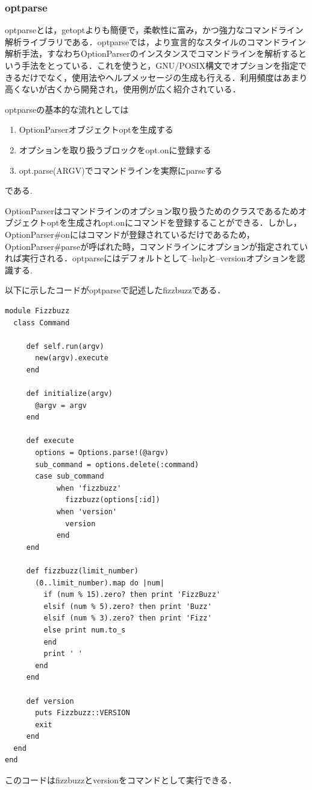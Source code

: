 \subsubsection{optparse}
optparseとは，getoptよりも簡便で，柔軟性に富み，かつ強力なコマンドライン解析ライブラリである．optparseでは，より宣言的なスタイルのコマンドライン解析手法，すなわちOptionParserのインスタンスでコマンドラインを解析するという手法をとっている．これを使うと，GNU/POSIX構文でオプションを指定できるだけでなく，使用法やヘルプメッセージの生成も行える\cite{1-3}．利用頻度はあまり高くないが古くから開発され，使用例が広く紹介されている．

optparseの基本的な流れとしては

\begin{enumerate}
\item OptionParserオブジェクトoptを生成する
\item オプションを取り扱うブロックをopt.onに登録する
\item opt.parse(ARGV)でコマンドラインを実際にparseする
\end{enumerate}
である.

OptionParserはコマンドラインのオプション取り扱うためのクラスであるためオブジェクトoptを生成されopt.onにコマンドを登録することができる．しかし，OptionParser\#onにはコマンドが登録されているだけであるため，OptionParser\#parseが呼ばれた時，コマンドラインにオプションが指定されていれば実行される．optparseにはデフォルトとして--helpと--versionオプションを認識する\cite{1-4}.

以下に示したコードがoptparseで記述したfizzbuzzである．
\begin{lstlisting}[style=customRuby,basicstyle={\scriptsize\ttfamily}]
module Fizzbuzz
  class Command

     def self.run(argv)
       new(argv).execute
     end

     def initialize(argv)
       @argv = argv
     end

     def execute
       options = Options.parse!(@argv)
       sub_command = options.delete(:command)
       case sub_command
            when 'fizzbuzz'
              fizzbuzz(options[:id])
            when 'version'
              version
            end
     end

     def fizzbuzz(limit_number)
       (0..limit_number).map do |num|
         if (num % 15).zero? then print 'FizzBuzz'
         elsif (num % 5).zero? then print 'Buzz'
         elsif (num % 3).zero? then print 'Fizz'
         else print num.to_s
         end
         print ' '
       end
     end

     def version
       puts Fizzbuzz::VERSION
       exit
     end
  end
end
\end{lstlisting}
このコードはfizzbuzzとversionをコマンドとして実行できる．

